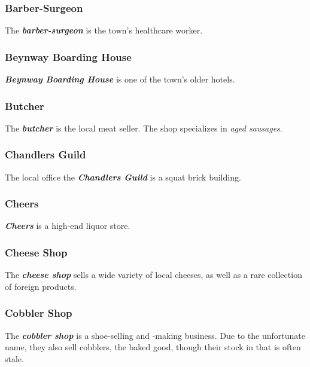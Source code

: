 \documentclass[11pt]{teraum_adventure}
\begin{document}
\subsubsection*{Barber-Surgeon}
\label{sec:org9d5b614}
The \textbf{\emph{barber-surgeon}} is the town's healthcare worker.
\subsubsection*{Beynway Boarding House}
\label{sec:org9461652}
\textbf{\emph{Beynway Boarding House}} is one of the town's older hotels.
\subsubsection*{Butcher}
\label{sec:org1b9fcdd}
The \textbf{\emph{butcher}} is the local meat seller. The shop specializes in \emph{aged
sausages}.
\subsubsection*{Chandlers Guild}
\label{sec:org0d5a075}
The local office the \textbf{\emph{Chandlers Guild}} is a squat brick building.
\subsubsection*{Cheers}
\label{sec:orgf6e2aff}
\textbf{\emph{Cheers}} is a high-end liquor store.
\subsubsection*{Cheese Shop}
\label{sec:org756b4cd}
The \textbf{\emph{cheese shop}} sells a wide variety of local cheeses, as well as
a rare collection of foreign products.
\subsubsection*{Cobbler Shop}
\label{sec:org7ac5bc8}
The \textbf{\emph{cobbler shop}} is a shoe-selling and -making business. Due to
the unfortunate name, they also sell cobblers, the baked good, though
their stock in that is often stale.
\end{document}
